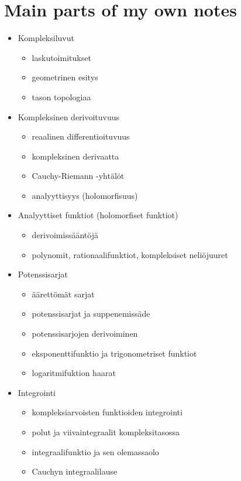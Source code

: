 \section{Main parts of my own notes}

\begin{itemize}
  \item Kompleksiluvut
  \begin{itemize}
    \item laskutoimitukset
    \item geometrinen esitys
    \item tason topologiaa
  \end{itemize}
  \item Kompleksinen derivoituvuus
  \begin{itemize}
    \item reaalinen differentioituvuus
    \item kompleksinen derivaatta
    \item Cauchy-Riemann -yhtälöt
    \item analyyttisyys (holomorfisuus)
  \end{itemize}
  \item Analyyttiset funktiot (holomorfiset funktiot)
  \begin{itemize}
    \item derivoimissääntöjä
    \item polynomit, rationaalifunktiot, kompleksiset neliöjuuret
  \end{itemize}
  \item Potenssisarjat
  \begin{itemize}
    \item äärettömät sarjat
    \item potenssisarjat ja suppenemissäde
    \item potenssisarjojen derivoiminen
    \item eksponenttifunktio ja trigonometriset funktiot
    \item logaritmifuktion haarat
  \end{itemize}
  \item Integrointi
  \begin{itemize}
    \item kompleksiarvoisten funktioiden integrointi
    \item polut ja viivaintegraalit kompleksitasossa
    \item integraalifunktio ja sen olemassaolo
    \item Cauchyn integraalilause
  \end{itemize}

\end{itemize}
